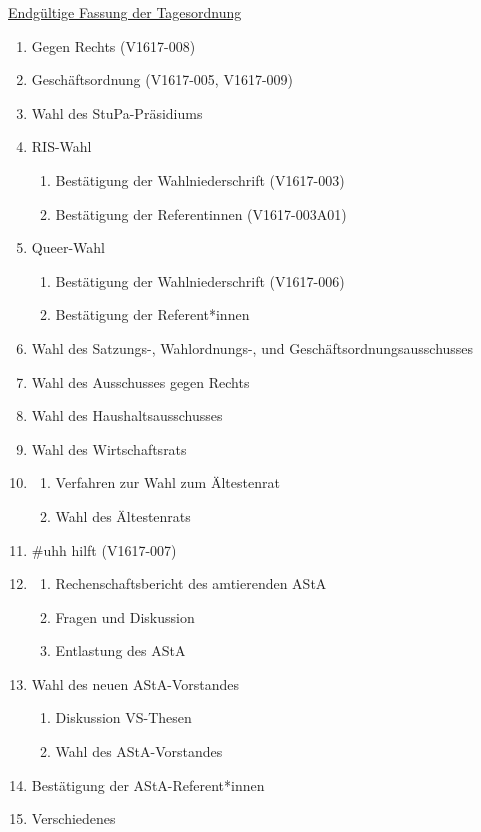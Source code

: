 \documentclass[ngerman,headheight=70pt]{scrartcl}
\begin{document}
    \underline{Endgültige Fassung der Tagesordnung}
    \begin{enumerate}[label={\textbf{Top \theenumi}},leftmargin=*]
        \item Gegen Rechts (V1617-008)
        \item Geschäftsordnung (V1617-005, V1617-009)
        \item Wahl des StuPa-Präsidiums
        \item RIS-Wahl
            \begin{enumerate}
                \item Bestätigung der Wahlniederschrift (V1617-003)
                \item Bestätigung der Referentinnen (V1617-003A01)
            \end{enumerate}
        \item Queer-Wahl
            \begin{enumerate}
                \item Bestätigung der Wahlniederschrift (V1617-006)
                \item Bestätigung der Referent*innen
            \end{enumerate}
        \item Wahl des Satzungs-, Wahlordnungs-, und Geschäftsordnungsausschusses
        \item Wahl des Ausschusses gegen Rechts
        \item Wahl des Haushaltsausschusses
        \item Wahl des Wirtschaftsrats
        \item
            \begin{enumerate}
                \item Verfahren zur Wahl zum Ältestenrat
                \item Wahl des Ältestenrats
            \end{enumerate}
        \item \#uhh hilft (V1617-007)
        \item
            \begin{enumerate}
                \item Rechenschaftsbericht des amtierenden AStA
                \item Fragen und Diskussion
                \item Entlastung des AStA
            \end{enumerate}
        \item Wahl des neuen AStA-Vorstandes
            \begin{enumerate}
                \item Diskussion VS-Thesen
                \item Wahl des AStA-Vorstandes
            \end{enumerate}
        \item Bestätigung der AStA-Referent*innen
        \item Verschiedenes
    \end{enumerate}
\end{document}
